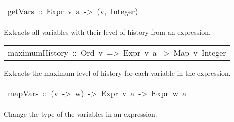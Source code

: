 \begin{haddockdesc}
\item[\begin{tabular}{@{}l}
getVars\ ::\ Expr\ v\ a\ ->\ {\char 91}(v,\ Integer){\char 93}
\end{tabular}]\haddockbegindoc
Extracts all variables with their level of history from an expression.
\par

\end{haddockdesc}
\begin{haddockdesc}
\item[\begin{tabular}{@{}l}
maximumHistory\ ::\ Ord\ v\ =>\ {\char 91}Expr\ v\ a{\char 93}\ ->\ Map\ v\ Integer
\end{tabular}]\haddockbegindoc
Extracts the maximum level of history for each variable in the expression.
\par

\end{haddockdesc}
\begin{haddockdesc}
\item[\begin{tabular}{@{}l}
mapVars\ ::\ (v\ ->\ w)\ ->\ Expr\ v\ a\ ->\ Expr\ w\ a
\end{tabular}]\haddockbegindoc
Change the type of the variables in an expression.
\par

\end{haddockdesc}